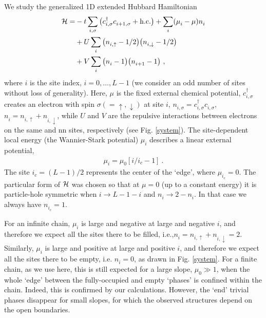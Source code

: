 \documentclass[aps,prl,showpacs,twocolumn,superscriptaddress]{revtex4-2}
\begin{document}
 We study the generalized 1D extended Hubbard Hamiltonian
\begin{align}
{\cal H}=&-t\sum_{i,\sigma} \big(c^{\dagger}_{i,\sigma}c^{}_{i+1,\sigma} +{\rm  h.c.}\big)  + \sum_i (\mu^{}_i -\mu)n^{}_i\nonumber\\
&+ U \sum_i \big(n^{}_{i,\uparrow}-1/2\big)\big(n^{}_{i,\downarrow}-1/2\big) \nonumber\\
&+ V \sum_{i} \big(n^{}_{i}-1\big)\big( n^{}_{i+1}-1\big) \ ,
\label{hamil}
\end{align}
where $i$ is the site index, $i=0,\dots,L-1$   (we consider an odd number of sites without loss of generality). Here, $\mu$ is the fixed external chemical potential,
$c^\dagger_{i,\sigma}$ creates an electron with spin $\sigma(=\uparrow,\downarrow)$ at site $i$, $n^{}_{i,\sigma}=c^\dagger_{i,\sigma}c^{}_{i,\sigma}$, $n^{}_i=n^{}_{i,\uparrow}+n^{}_{i,\downarrow}$, while $U$ and $V$ are the repulsive interactions  between electrons on the same  and  nn sites, respectively (see Fig. \ref{system}). The site-dependent local energy (the Wannier-Stark potential)
$\mu^{}_i$ describes a linear external  potential,
\begin{align}
\mu^{}_i=\mu^{}_0[i/i^{}_c-1]\ .
\label{mui}
\end{align}
The site $i^{}_c=(L-1)/2$ represents the center of the `edge', where $\mu^{}_{i^{}_c}=0$.
The particular form of ${\cal H}$ was chosen so that at $\mu=0$ (up to a constant energy) it is particle-hole symmetric when $i\rightarrow L-1-i$ and $n^{}_i\rightarrow 2-n^{}_i$. In that case we always have  $n^{}_{i^{}_c}=1$.



For an infinite chain, $\mu^{}_i$ is large and negative at large and negative $i$, and therefore we expect all the sites there to be filled, i.e.,$n^{}_i=n^{}_{i,\uparrow}+n^{}_{i,\downarrow}=2$. Similarly, $\mu^{}_i$ is large and positive at large and positive $i$, and therefore we expect all the sites there to be empty, i.e. $n^{}_i=0$, as drawn in Fig. \ref{system}. For a finite chain, as we use here, this is still expected for a large slope, $\mu^{}_0\gg 1$, when the whole `edge' between the fully-occupied and empty `phases' is confined within the chain. Indeed, this is confirmed by our calculations. However,
the `end' trivial phases disappear for small slopes, for which the observed structures depend on the open boundaries.
\end{document}
